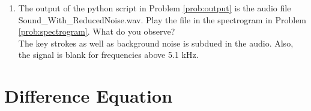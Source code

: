 \documentclass[journal,12pt,twocolumn]{IEEEtran}
\renewcommand\thesection{\arabic{section}}
\begin{document}
\begin{enumerate}[label=\thesection.\arabic*
,ref=\thesection.\theenumi]
\begin{lstlisting}
python3 2.3.py
\end{lstlisting}
%
\item
The output of the python script in Problem \ref{prob:output} is the audio file Sound\_With\_ReducedNoise.wav. Play the file in the spectrogram in Problem \ref{prob:spectrogram}. What do you observe?
\\
\solution The key strokes as well as background noise is subdued in the audio.  Also,  the signal is blank for frequencies above 5.1 kHz.
\end{enumerate}
\section{Difference Equation}
\end{document}
